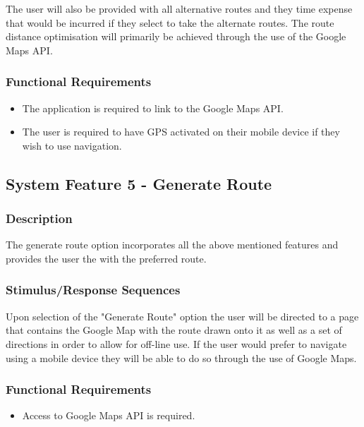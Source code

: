 \documentclass[10pt, a4paper, onecolumn]{scrartcl}
\begin{document}
				The user will also be provided with all alternative routes and they time expense that would be incurred if they select to take the alternate routes. The route distance optimisation will primarily be achieved through the use of the Google Maps API.
			
			\subsubsection{Functional Requirements}
			
				\begin{itemize}
					\item The application is required to link to the Google Maps API.
					\item The user is required to have GPS activated on their mobile device if they wish to use navigation.
				\end{itemize}
		
		\subsection{System Feature 5 - Generate Route}
		
			\subsubsection{Description}
			
				The generate route option incorporates all the above mentioned features and provides the user the with the preferred route. 
				
			\subsubsection{Stimulus/Response Sequences}
			
				Upon selection of the "Generate Route" option the user will be directed to a page that contains the Google Map with the route drawn onto it as well as a set of directions in order to allow for off-line use. If the user would prefer to navigate using a mobile device they will be able to do so through the use of Google Maps.
				
			\subsubsection{Functional Requirements}
			
				\begin{itemize}
					\item Access to Google Maps API is required.
				\end{itemize}
				
\end{document}
